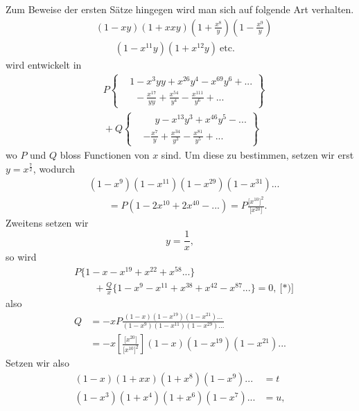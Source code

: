 \begingroup
\newcommand{\TransBracket}[1]{\boldsymbol{[}#1\boldsymbol{]}}
\noindent[S. 47]\par
\par\indent Zum Beweise der ersten Sätze hingegen wird man sich auf folgende Art verhalten.
\[\begin{aligned}
&(1-xy)(1+xxy)\left(1+\frac{x^8}{y}\right)\left(1-\frac{x^9}{y}\right)\\
&\qquad(1-x^{11}y)(1+x^{12}y)\ \text{etc.}
\end{aligned}\]
\noindent wird entwickelt in
\[\begin{aligned}
&P\left\{\begin{aligned}
&1-x^3yy+x^{26}y^4-x^{69}y^6+{.}{.}{.}\\
&\phantom{1}{-}\frac{x^{17}}{yy}+\frac{x^{54}}{y^4}-\frac{x^{111}}{y^6}+{.}{.}{.}
\end{aligned}\right\}\\[1ex]
&{}+Q\left\{\begin{aligned}
&\phantom{{}-{}}y-x^{13}y^3+x^{46}y^5-{.}{.}{.}\\
&-\frac{x^7}{y}+\frac{x^{34}}{y^3}-\frac{x^{81}}{y^5}+{.}{.}{.}
\end{aligned}\right\}
\end{aligned}\]
\noindent wo $P$ und $Q$ bloss Functionen von $x$ sind. Um diese zu bestimmen, setzen wir erst $y=x^{\frac72}$, wodurch
\[\begin{aligned}
&(1-x^9)(1-x^{11})(1-x^{29})(1-x^{31}){.}{.}{.}\\
&\qquad=P(1-2x^{10}+2x^{40}-{.}{.}{.})
=P\frac{\TransBracket{x^{10}}^2}{\TransBracket{x^{20}}}.
\end{aligned}\]
\noindent Zweitens setzen wir
\[
y=\frac1x,
\]
\noindent so wird
\[\begin{aligned}
&P\{1-x-x^{19}+x^{22}+x^{58}{.}{.}{.}\}\\
&\qquad+\frac Qx\{1-x^9-x^{11}+x^{38}+x^{42}-x^{87}{.}{.}{.}\}=0,\ \text{[*)]}
\end{aligned}\]
\noindent also
\[\begin{aligned}
Q&=-xP\frac{(1-x)(1-x^{19})(1-x^{21}){.}{.}{.}}{(1-x^9)(1-x^{11})(1-x^{29}){.}{.}{.}}\\
&=-x\left[\frac{\TransBracket{x^{20}}}{\TransBracket{x^{10}}^2}\right](1-x)(1-x^{19})(1-x^{21}){.}{.}{.}
\end{aligned}\]
\noindent Setzen wir also
\[\begin{aligned}
(1-x)(1+xx)(1+x^8)(1-x^9){.}{.}{.}&=t\\
(1-x^3)(1+x^4)(1+x^6)(1-x^7){.}{.}{.}&=u,
\end{aligned}\]
